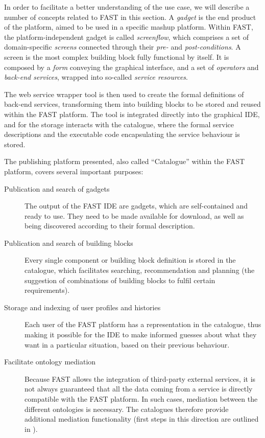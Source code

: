 In order to facilitate a better understanding of the use case, we will describe a number of concepts related to FAST in this section. A \emph{gadget} is the end product of the platform, aimed to be used in a specific mashup platform. Within FAST, the platform-independent gadget is called \emph{screenflow}, which comprises a set of domain-specific \emph{screens} connected through their \emph{pre-} and \emph{post-conditions}. A screen is the most complex building block fully functional by itself. It is composed by a \emph{form} conveying the graphical interface, and a set of \emph{operators} and \emph{back-end services}, wrapped into so-called \emph{service resources}.

The web service wrapper tool is then used to create the formal definitions of back-end services, transforming them into building blocks to be stored and reused within the FAST platform. The tool is integrated directly into the graphical IDE, and for the storage interacts with the catalogue, where the formal service descriptions and the executable code encapsulating the service behaviour is stored.

The publishing platform presented, also called ``Catalogue'' within the FAST platform, covers several important purposes:
\begin{description}
	\item[Publication and search of gadgets] The output of the FAST IDE are gadgets, which are self-contained and ready to use. They need to be made available for download, as well as being discovered according to their formal description.
	\item[Publication and search of building blocks] Every single component or building block definition is stored in the catalogue, which facilitates searching, recommendation and planning (the suggestion of combinations of building blocks to fulfil certain requirements). 
	\item[Storage and indexing of user profiles and histories] Each user of the FAST platform has a representation in the catalogue, thus making it possible for the IDE to make informed guesses about what they want in a particular situation, based on their previous behaviour.
	\item[Facilitate ontology mediation] Because FAST allows the integration of third-party external services, it is not always guaranteed that all the data coming from a service is directly compatible with the FAST platform. In such cases, mediation between the different ontologies is necessary. The catalogues therefore provide additional mediation functionality (first steps in this direction are outlined in \cite{Ambrus:2009it}).
\end{description}
